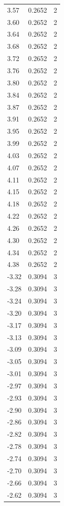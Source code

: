 \begin{longtable}{lrr}
  3.57 & 0.2652 & 2 \\
  3.60 & 0.2652 & 2 \\
  3.64 & 0.2652 & 2 \\
  3.68 & 0.2652 & 2 \\
  3.72 & 0.2652 & 2 \\
  3.76 & 0.2652 & 2 \\
  3.80 & 0.2652 & 2 \\
  3.84 & 0.2652 & 2 \\
  3.87 & 0.2652 & 2 \\
  3.91 & 0.2652 & 2 \\
  3.95 & 0.2652 & 2 \\
  3.99 & 0.2652 & 2 \\
  4.03 & 0.2652 & 2 \\
  4.07 & 0.2652 & 2 \\
  4.11 & 0.2652 & 2 \\
  4.15 & 0.2652 & 2 \\
  4.18 & 0.2652 & 2 \\
  4.22 & 0.2652 & 2 \\
  4.26 & 0.2652 & 2 \\
  4.30 & 0.2652 & 2 \\
  4.34 & 0.2652 & 2 \\
  4.38 & 0.2652 & 2 \\
  -3.32 & 0.3094 & 3 \\
  -3.28 & 0.3094 & 3 \\
  -3.24 & 0.3094 & 3 \\
  -3.20 & 0.3094 & 3 \\
  -3.17 & 0.3094 & 3 \\
  -3.13 & 0.3094 & 3 \\
  -3.09 & 0.3094 & 3 \\
  -3.05 & 0.3094 & 3 \\
  -3.01 & 0.3094 & 3 \\
  -2.97 & 0.3094 & 3 \\
  -2.93 & 0.3094 & 3 \\
  -2.90 & 0.3094 & 3 \\
  -2.86 & 0.3094 & 3 \\
  -2.82 & 0.3094 & 3 \\
  -2.78 & 0.3094 & 3 \\
  -2.74 & 0.3094 & 3 \\
  -2.70 & 0.3094 & 3 \\
  -2.66 & 0.3094 & 3 \\
  -2.62 & 0.3094 & 3 \\

\end{longtable}

